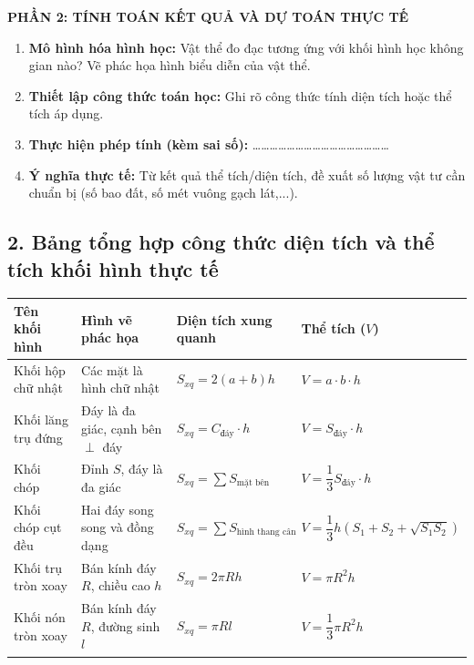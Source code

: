 \documentclass[12pt, a4paper]{article}
\begin{document}
\begin{tcolorbox}[enhanced, colback=white, colframe=blue!70!black, arc=1.5mm, title=\textbf{PHIẾU HỌC TẬP THỰC ĐỊA: ĐO ĐẠC VÀ MÔ HÌNH HÓA HÌNH HỌC KHÔNG GIAN}]
\textbf{\large PHẦN 2: TÍNH TOÁN KẾT QUẢ VÀ DỰ TOÁN THỰC TẾ}
\begin{enumerate}
    \item \textbf{Mô hình hóa hình học:} Vật thể đo đạc tương ứng với khối hình học không gian nào? Vẽ phác họa hình biểu diễn của vật thể.
    \item \textbf{Thiết lập công thức toán học:} Ghi rõ công thức tính diện tích hoặc thể tích áp dụng.
    \item \textbf{Thực hiện phép tính (kèm sai số):} \dots\dots\dots\dots\dots\dots\dots\dots\dots\dots\dots\dots\dots\dots\dots\dots
    \item \textbf{Ý nghĩa thực tế:} Từ kết quả thể tích/diện tích, đề xuất số lượng vật tư cần chuẩn bị (số bao đất, số mét vuông gạch lát,...).
\end{enumerate}
\end{tcolorbox}

\vspace{5pt}

\subsection*{2. Bảng tổng hợp công thức diện tích và thể tích khối hình thực tế}

\begin{center}
\begin{tabularx}{\textwidth}{|>{\centering\arraybackslash}p{3cm}|>{\centering\arraybackslash}p{4cm}|>{\centering\arraybackslash}X|>{\centering\arraybackslash}X|}
\hline
\textbf{Tên khối hình} & \textbf{Hình vẽ phác họa} & \textbf{Diện tích xung quanh} & \textbf{Thể tích ($V$)} \\
\hline
Khối hộp chữ nhật & Các mặt là hình chữ nhật & $S_{xq} = 2(a + b)h$ & $V = a \cdot b \cdot h$ \\
\hline
Khối lăng trụ đứng & Đáy là đa giác, cạnh bên $\perp$ đáy & $S_{xq} = C_{\text{đáy}} \cdot h$ & $V = S_{\text{đáy}} \cdot h$ \\
\hline
Khối chóp & Đỉnh $S$, đáy là đa giác & $S_{xq} = \sum S_{\text{mặt bên}}$ & $V = \dfrac{1}{3} S_{\text{đáy}} \cdot h$ \\
\hline
Khối chóp cụt đều & Hai đáy song song và đồng dạng & $S_{xq} = \sum S_{\text{hình thang cân}}$ & $V = \dfrac{1}{3} h (S_1 + S_2 + \sqrt{S_1 S_2})$ \\
\hline
Khối trụ tròn xoay & Bán kính đáy $R$, chiều cao $h$ & $S_{xq} = 2\pi R h$ & $V = \pi R^2 h$ \\
\hline
Khối nón tròn xoay & Bán kính đáy $R$, đường sinh $l$ & $S_{xq} = \pi R l$ & $V = \dfrac{1}{3} \pi R^2 h$ \\
\hline
\end{tabularx}
\end{center}
\end{document}
